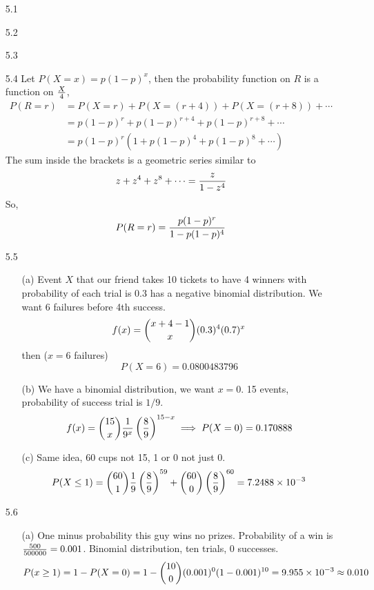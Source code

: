 \documentclass[english, 11pt]{article}
\begin{document}
  \begin{itemize}
    \item[5.1]
    \item[5.2]
    \item[5.3]
    \item[5.4] Let $P(X = x) = p(1-p)^x$, then the probability function on $R$ is a function on $\frac{X}{4}$,
    \begin{align*}
      P(R = r) & = P(X = r) + P(X = (r + 4)) + P(X = (r + 8)) + \cdots \\
               & = p(1-p)^r + p(1-p)^{r + 4} + p(1-p)^{r+8} + \cdots \\
               & = p(1-p)^r ( 1 + p(1-p)^4 + p(1-p)^8 + \cdots)
    \end{align*}
    The sum inside the brackets is a geometric series similar to
    \[ z + z^4 + z^8 + \cdots = \frac{z}{1-z^4} \]
    So,
    \[  P(R = r) = \frac{p(1-p)^r}{1 - p(1-p)^4} \]


    \item[5.5]
    \begin{itemize}
      \item[(a)] Event $X$ that our friend takes 10 tickets to have 4 winners with probability of each trial is 0.3 has a negative binomial distribution. We want 6 failures before 4th success.
    \[ f(x) = {x + 4 - 1 \choose x}(0.3)^4(0.7)^{x} \]
    then ($x = 6$ failures)
    \[ P(X = 6) = 0.0800483796 \]

    \item[(b)] We have a binomial distribution, we want $x = 0$. 15 events, probability of success trial is $1/9$.
    \[ f(x) = {15 \choose x} \frac{1}{9^x} \left( \frac{8}{9} \right)^{15-x} \implies P(X = 0) = 0.170888 \]

    \item[(c)] Same idea, 60 cups not 15, 1 or 0 not just 0.
    \[ P(X \leq 1) = {60 \choose 1} \frac{1}{9} \left( \frac{8}{9} \right)^{59} + {60 \choose 0}  \left( \frac{8}{9} \right)^{60}  = 7.2488\times 10^{-3} \]

    \end{itemize}

    \item[5.6]
    \begin{itemize}
      \item[(a)] One minus probability this guy wins no prizes. Probability of a win is $\frac{500}{500000} = 0.001$. Binomial distribution, ten trials, 0 successes.
      \[ P(x \geq 1) = 1 - P(X = 0) = 1 - {10 \choose 0}(0.001)^0(1-0.001)^{10} = 9.955\times 10^{-3} \approx 0.010 \]


\end{itemize}
\end{itemize}
\end{document}
